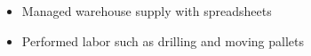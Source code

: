 \documentclass[12pt,letter]{altacv}
\begin{document}
\divider

\begin{itemize}
\item Managed warehouse supply with spreadsheets

\item Performed labor such as drilling and moving pallets
\end{itemize}






\clearpage

\end{document}
